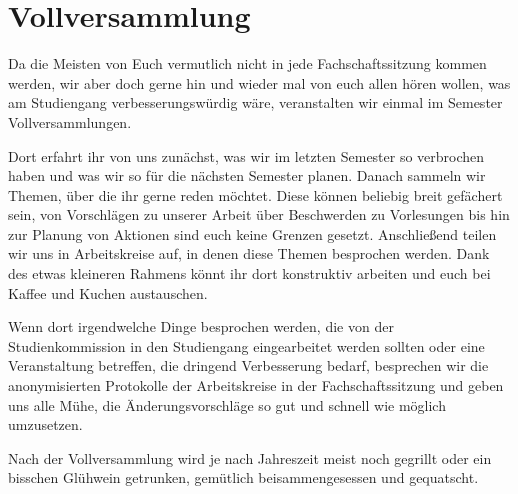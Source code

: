 \section{Vollversammlung}
Da die Meisten von Euch vermutlich nicht in jede Fachschaftssitzung kommen werden, wir aber doch gerne hin und wieder mal von euch allen hören wollen, was am Studiengang verbesserungswürdig wäre, veranstalten wir einmal im Semester Vollversammlungen.

Dort erfahrt ihr von uns zunächst, was wir im letzten Semester so verbrochen haben und was wir so für die nächsten Semester planen. Danach sammeln wir Themen, über die ihr gerne reden möchtet. Diese können beliebig breit gefächert sein, von Vorschlägen zu unserer Arbeit über Beschwerden zu Vorlesungen bis hin zur Planung von Aktionen sind euch keine Grenzen gesetzt. Anschließend teilen wir uns in Arbeitskreise auf, in denen diese Themen besprochen werden. Dank des etwas kleineren Rahmens könnt ihr dort konstruktiv arbeiten und euch bei Kaffee und Kuchen austauschen.

Wenn dort irgendwelche Dinge besprochen werden, die von der Studienkommission in den Studiengang eingearbeitet werden sollten oder eine Veranstaltung betreffen, die dringend Verbesserung bedarf, besprechen wir die anonymisierten Protokolle der Arbeitskreise in der Fachschaftssitzung und geben uns alle Mühe, die Änderungsvorschläge so gut und schnell wie möglich umzusetzen.

Nach der Vollversammlung wird je nach Jahreszeit meist noch gegrillt oder ein bisschen Glühwein getrunken, gemütlich beisammengesessen und gequatscht.
